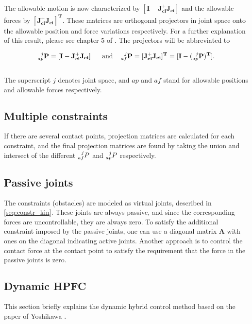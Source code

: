 The allowable motion is now characterized by $\mathbf{[I - J_{ci}^+ J_{ci}]}$ and the allowable forces by $\mathbf{[J_{ci}^+ J_{ci}]^T}$. These matrices are orthogonal projectors in joint space onto the allowable position and force variations respectively. For a further explanation of this result, please see chapter 5 of \cite{west1985method}. The projectors will be abbreviated to

\begin{equation}\label{eq:proj_mtrices}
    \mathbf{
    \prescript{j}{ap}{P} = [I - J_{ci}^+ J_{ci}] \ \ \quad \textrm{and} \quad
    \prescript{j}{af}{P} = [J_{ci}^+ J_{ci}]^T = [I - (\prescript{j}{ap}{P})^T]
    }.
\end{equation}
\\
The superscript $j$ denotes joint space, and $ap$ and $af$ stand for allowable positions and allowable forces respectively.

\subsection{Multiple constraints}\label{subseq:mult_contacts}

If there are several contact points, projection matrices are calculated for each constraint, and the final projection matrices are found by taking the union and intersect of the different $\prescript{j}{af}{P}$ and $\prescript{j}{ap}{P}$ respectively.

\subsection{Passive joints}
The constraints (obstacles) are modeled as virtual joints, described in \ref{seq:constr_kin}. These joints are always passive, and since the corresponding forces are uncontrollable, they are always zero. To satisfy the additional constraint imposed by the passive joints, one can use a diagonal matrix $\mathbf{A}$ with ones on the diagonal indicating active joints. Another approach is to control the contact force at the contact point to satisfy the requirement that the force in the passive joints is zero.

\subsection{Dynamic HPFC}\label{subseq:dynhpfc}

This section briefly explains the dynamic hybrid control method based on the paper of Yoshikawa \cite{yoshikawa1987dynamic}. 

